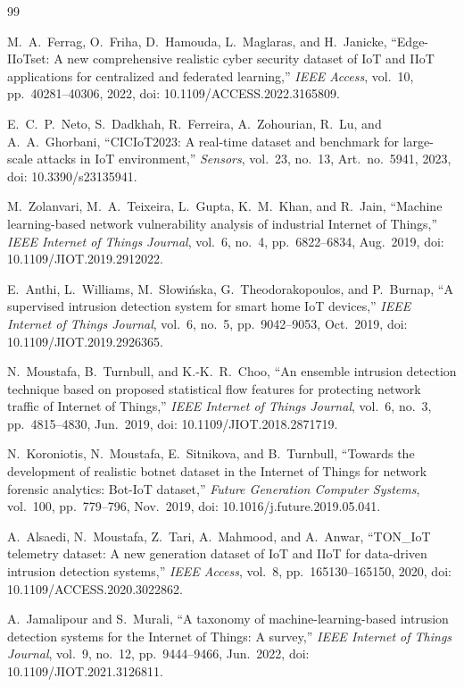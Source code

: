 \documentclass[10pt,journal,twocolumn]{IEEEtran}
\begin{document}
\begin{thebibliography}{99}

M.~A.~Ferrag, O.~Friha, D.~Hamouda, L.~Maglaras, and H.~Janicke, ``Edge-IIoTset: A new comprehensive realistic cyber security dataset of IoT and IIoT applications for centralized and federated learning,'' \emph{IEEE Access}, vol.~10, pp.~40281--40306, 2022, doi: 10.1109/ACCESS.2022.3165809.

E.~C.~P.~Neto, S.~Dadkhah, R.~Ferreira, A.~Zohourian, R.~Lu, and A.~A.~Ghorbani, ``CICIoT2023: A real-time dataset and benchmark for large-scale attacks in IoT environment,'' \emph{Sensors}, vol.~23, no.~13, Art.~no.~5941, 2023, doi: 10.3390/s23135941.

M.~Zolanvari, M.~A.~Teixeira, L.~Gupta, K.~M.~Khan, and R.~Jain, ``Machine learning-based network vulnerability analysis of industrial Internet of Things,'' \emph{IEEE Internet of Things Journal}, vol.~6, no.~4, pp.~6822--6834, Aug.~2019, doi: 10.1109/JIOT.2019.2912022.

E.~Anthi, L.~Williams, M.~S{\l}owi{\'n}ska, G.~Theodorakopoulos, and P.~Burnap, ``A supervised intrusion detection system for smart home IoT devices,'' \emph{IEEE Internet of Things Journal}, vol.~6, no.~5, pp.~9042--9053, Oct.~2019, doi: 10.1109/JIOT.2019.2926365.

N.~Moustafa, B.~Turnbull, and K.-K.~R.~Choo, ``An ensemble intrusion detection technique based on proposed statistical flow features for protecting network traffic of Internet of Things,'' \emph{IEEE Internet of Things Journal}, vol.~6, no.~3, pp.~4815--4830, Jun.~2019, doi: 10.1109/JIOT.2018.2871719.

N.~Koroniotis, N.~Moustafa, E.~Sitnikova, and B.~Turnbull, ``Towards the development of realistic botnet dataset in the Internet of Things for network forensic analytics: Bot-IoT dataset,'' \emph{Future Generation Computer Systems}, vol.~100, pp.~779--796, Nov.~2019, doi: 10.1016/j.future.2019.05.041.

A.~Alsaedi, N.~Moustafa, Z.~Tari, A.~Mahmood, and A.~Anwar, ``TON\_IoT telemetry dataset: A new generation dataset of IoT and IIoT for data-driven intrusion detection systems,'' \emph{IEEE Access}, vol.~8, pp.~165130--165150, 2020, doi: 10.1109/ACCESS.2020.3022862.

A.~Jamalipour and S.~Murali, ``A taxonomy of machine-learning-based intrusion detection systems for the Internet of Things: A survey,'' \emph{IEEE Internet of Things Journal}, vol.~9, no.~12, pp.~9444--9466, Jun.~2022, doi: 10.1109/JIOT.2021.3126811.


\end{thebibliography}
\end{document}
